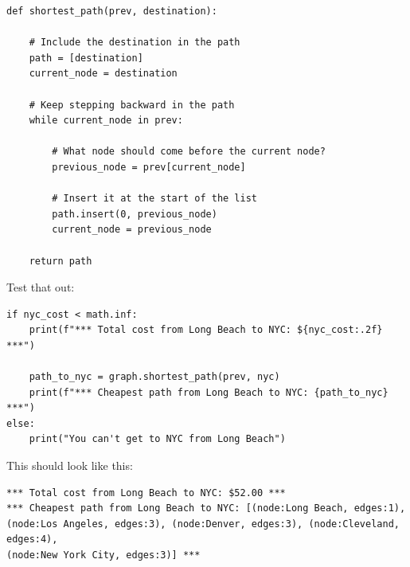 \begin{verbatim}
def shortest_path(prev, destination):

    # Include the destination in the path
    path = [destination]
    current_node = destination

    # Keep stepping backward in the path
    while current_node in prev:

        # What node should come before the current node?
        previous_node = prev[current_node]

        # Insert it at the start of the list
        path.insert(0, previous_node)
        current_node = previous_node

    return path
\end{verbatim}

Test that out:

\begin{verbatim}
if nyc_cost < math.inf:
    print(f"*** Total cost from Long Beach to NYC: ${nyc_cost:.2f} ***")

    path_to_nyc = graph.shortest_path(prev, nyc)
    print(f"*** Cheapest path from Long Beach to NYC: {path_to_nyc} ***")
else:
    print("You can't get to NYC from Long Beach")
\end{verbatim}

This should look like this:
\begin{verbatim}
*** Total cost from Long Beach to NYC: $52.00 ***
*** Cheapest path from Long Beach to NYC: [(node:Long Beach, edges:1),
(node:Los Angeles, edges:3), (node:Denver, edges:3), (node:Cleveland, edges:4),
(node:New York City, edges:3)] ***
\end{verbatim}





